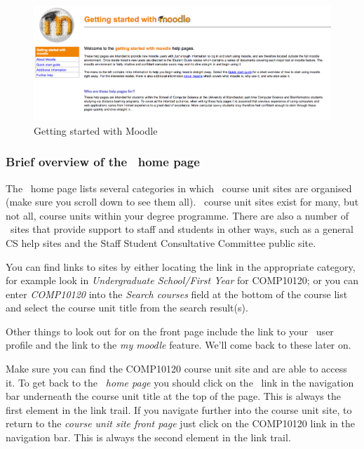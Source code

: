 \begin{figure}
\centerline{\includegraphics[width=15cm]{images/start-moodle-page}}
\caption{Getting started with Moodle}\label{figure:moodle-start}
\end{figure}

\subsubsection*{Brief overview of the \moodle\ home page}
\label{sec:brief-overv-moodle}


The \moodle\ home page lists several categories in which \moodle\ course unit sites are organised (make sure you scroll down to see them all). \moodle\ course unit sites exist for many, but not all, course units within your degree programme. There are also a number of \moodle\ sites that provide support to staff and students in other ways, such as a general CS help sites and the Staff Student Consultative Committee public site.

You can find links to sites by either locating the link in the appropriate category, for example look in \emph{Undergraduate School/First Year} for COMP10120; or you can enter \emph{COMP10120} into the \emph{Search courses} field at the bottom of the course list and select the course unit title from the search result(s).

Other things to look out for on the front page include the link to your \moodle\ user profile and the link to the \emph{my moodle} feature. We'll come back to these later on.




Make sure you can find the COMP10120 course unit site and are able to access it. To get back to the \emph{\moodle\ home page} you should click on the \moodle\ link in the navigation bar underneath the course unit title at the top of the page. This is always the first element in the link trail. If you navigate further into the course unit site, to return to the \emph{course unit site front page} just click on the COMP10120 link in the navigation bar. This is always the second element in the link trail.

